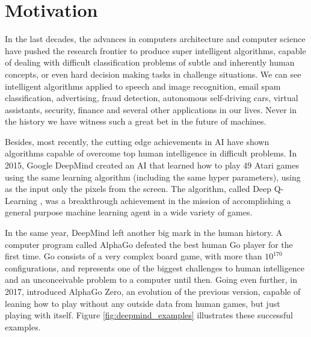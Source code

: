 \section{Motivation}


In the last decades, the advances in computers architecture and computer science have pushed the research frontier to produce super intelligent algorithms, capable of dealing with difficult classification problems of subtle and inherently human concepts, or even hard decision making tasks in challenge situations. We can see intelligent algorithms applied to speech and image recognition, email spam classification, advertising, fraud detection, autonomous self-driving cars, virtual assistants, security, finance and several other applications in our lives. Never in the history we have witness such a great bet in the future of machines.


Besides, most recently, the cutting edge achievements in AI have shown algorithms capable of overcome top human intelligence in difficult problems. In 2015, Google DeepMind created an AI that learned how to play 49 Atari games using the same learning algorithm (including the same hyper parameters), using as the input only the pixels from the screen. The algorithm, called Deep Q-Learning \cite{RLNature2015}, was a breakthrough achievement in the mission of accomplishing a general purpose machine learning agent in a wide variety of games.

In the same year, DeepMind left another big mark in the human history. A computer program called AlphaGo defeated the best human Go player for the first time. Go consists of a very complex board game, with more than $10^{170}$ configurations, and represents one of the biggest challenges to human intelligence and an unconceivable problem to a computer until then. Going even further, in 2017,  introduced AlphaGo Zero, an evolution of the previous version, capable of leaning how to play without any outside data from human games, but just playing with itself. Figure \ref{fig:deepmind_examples} illustrates these successful examples.

